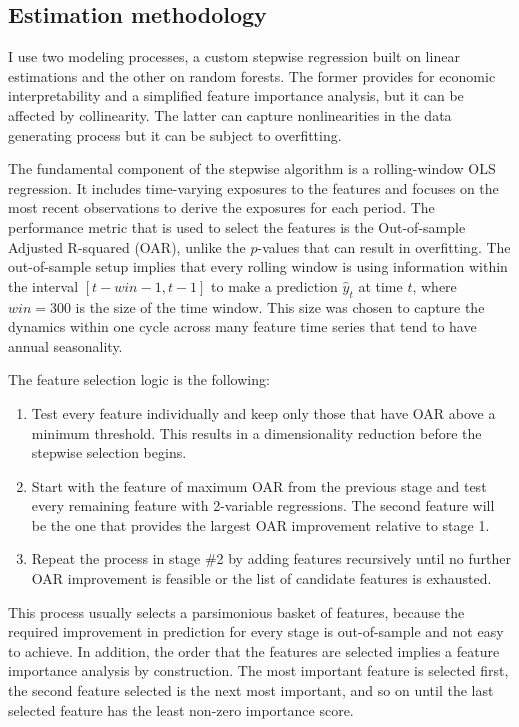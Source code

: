 \documentclass[12pt]{article}
\begin{document}
\subsection{Estimation methodology}

I use two modeling processes, a custom stepwise regression built on linear estimations and the other on random forests. The former provides for economic interpretability and a simplified feature importance analysis, but it can be affected by collinearity. The latter can capture nonlinearities in the data generating process but it can be subject to overfitting.

The fundamental component of the stepwise algorithm is a rolling-window OLS regression. It includes time-varying exposures to the features and focuses on the most recent observations to derive the exposures for each period. The performance metric that is used to select the features is the Out-of-sample Adjusted R-squared (OAR), unlike the $p$-values that can result in overfitting. The out-of-sample setup implies that every rolling window is using information within the interval $[t-win-1, t-1]$ to make a prediction $\hat y_t$ at time $t$, where $win=300$ is the size of the time window. This size was chosen to capture the dynamics within one cycle across many feature time series that tend to have annual seasonality.

The feature selection logic is the following:
\begin{enumerate}
	\item Test every feature individually and keep only those that have OAR above a minimum threshold. This results in a dimensionality reduction before the stepwise selection begins.
	\item Start with the feature of maximum OAR from the previous stage and test every remaining feature with 2-variable regressions. The second feature will be the one that provides the largest OAR improvement relative to stage 1.
	\item Repeat the process in stage \#2 by adding features recursively until no further OAR improvement is feasible or the list of candidate features is exhausted.
\end{enumerate}

This process usually selects a parsimonious basket of features, because the required improvement in prediction for every stage is out-of-sample and not easy to achieve. In addition, the order that the features are selected implies a feature importance analysis by construction. The most important feature is selected first, the second feature selected is the next most important, and so on until the last selected feature has the least non-zero importance score.
\end{document}
